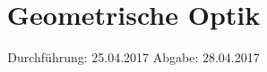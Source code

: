 

\subject{V408}
\title{Geometrische Optik}
\date{
\centering
  Durchführung: 25.04.2017
  \hspace{3em}
  Abgabe: 28.04.2017
}



\maketitle
\thispagestyle{empty}
\tableofcontents
\newpage



%




\printbibliography


